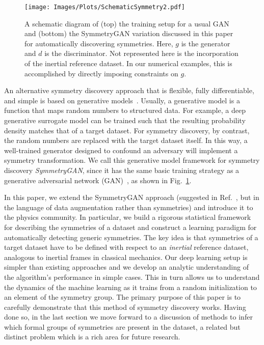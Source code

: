 \documentclass[aps,prx,reprint,preprintnumbers,superscriptaddress,nofootinbib,longbibliography,floatfix]{revtex4-1}
\DeclareRobustCommand{\Fig}[1]{Fig.~\ref{fig:#1}}
\DeclareRobustCommand{\Ref}[1]{Ref.~\cite{#1}}
\begin{document}
\begin{figure}
    \centering
    \texttt{[image: Images/Plots/SchematicSymmetry2.pdf]}
    \caption{
    A schematic diagram of (top) the training setup for a usual GAN and (bottom) the SymmetryGAN variation discussed in this paper for automatically discovering symmetries.
    Here, $g$ is the generator and $d$ is the discriminator.
    Not represented here is the incorporation of the inertial reference dataset.
    In our numerical examples, this is accomplished by directly imposing constraints on $g$.
    }
    \label{fig:schematic}
\end{figure}


An alternative symmetry discovery approach that is flexible, fully differentiable, and simple is based on generative models~\cite{hataya2019faster,antoniou2018data}.
%
Usually, a generative model is a function that maps random numbers to structured data.
%
For example, a deep generative surrogate model can be trained such that the resulting probability density matches that of a target dataset.
%
For symmetry discovery, by contrast, the random numbers are replaced with the target dataset itself.
%
In this way, a well-trained generator designed to confound an adversary will implement a symmetry transformation.  
%
We call this generative model framework for symmetry discovery \emph{SymmetryGAN}, since it has the same basic training strategy as a generative adversarial network (GAN)~\cite{Goodfellow:2014upx}, as shown in \Fig{schematic}.


In this paper, we extend the SymmetryGAN approach (suggested in \Ref{lim2019fast}, but in the language of data augmentation rather than symmetries) and introduce it to the physics community.
%
In particular, we build a rigorous statistical framework for describing the symmetries of a dataset and construct a learning paradigm for automatically detecting generic symmetries.
%
The key idea is that symmetries of a target dataset have to be defined with respect to an \emph{inertial} reference dataset, analogous to inertial frames in classical mechanics.
%
Our deep learning setup is simpler than existing approaches and we develop an analytic understanding of the algorithm's performance in simple cases.
%
This in turn allows us to understand the dynamics of the machine learning as it trains from a random initialization to an element of the symmetry group.
%
The primary purpose of this paper is to carefully demonstrate that this method of symmetry discovery works.
%
Having done so, in the last section we move forward to a discussion of methods to infer which formal groups of symmetries are present in the dataset, a related but distinct problem which is a rich area for future research.
\end{document}
